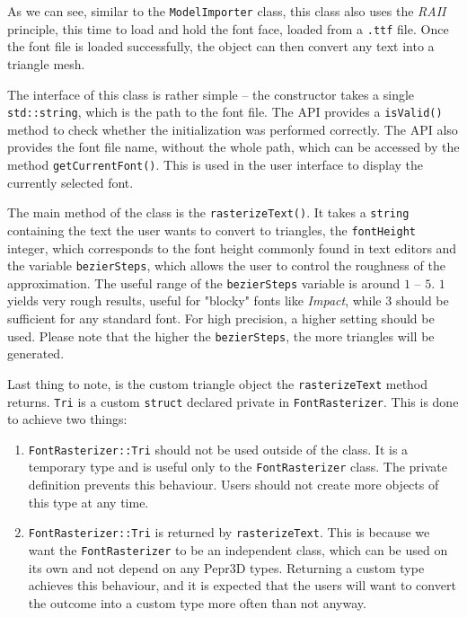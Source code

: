 As we can see, similar to the \texttt{ModelImporter} class, this class also uses the \textit{RAII} principle, this time to load and hold the font face, loaded from a \texttt{.ttf} file. Once the font file is loaded successfully, the object can then convert any text into a triangle mesh.

The interface of this class is rather simple -- the constructor takes a single \texttt{std::string}, which is the path to the font file. The API provides a \texttt{isValid()} method to check whether the initialization was performed correctly. The API also provides the font file name, without the whole path, which can be accessed by the method \texttt{getCurrentFont()}. This is used in the user interface to display the currently selected font.

The main method of the class is the \texttt{rasterizeText()}. It takes a \texttt{string} containing the text the user wants to convert to triangles, the \texttt{fontHeight} integer, which corresponds to the font height commonly found in text editors and the variable \texttt{bezierSteps}, which allows the user to control the roughness of the approximation. The useful range of the \texttt{bezierSteps} variable is around $1$ -- $5$. $1$ yields very rough results, useful for "blocky" fonts like \textit{Impact}, while $3$ should be sufficient for any standard font. For high precision, a higher setting should be used. Please note that the higher the \texttt{bezierSteps}, the more triangles will be generated.

Last thing to note, is the custom triangle object the \texttt{rasterizeText} method returns. \texttt{Tri} is a custom \texttt{struct} declared private in \texttt{FontRasterizer}. This is done to achieve two things: 

\begin{enumerate}
\item \texttt{FontRasterizer::Tri} should not be used outside of the class. It is a temporary type and is useful only to the \texttt{FontRasterizer} class. The private definition prevents this behaviour. Users should not create more objects of this type at any time.

\item \texttt{FontRasterizer::Tri} is returned by \texttt{rasterizeText}. This is because we want the \texttt{FontRasterizer} to be an independent class, which can be used on its own and not depend on any Pepr3D types. Returning a custom type achieves this behaviour, and it is expected that the users will want to convert the outcome into a custom type more often than not anyway.
\end{enumerate}

